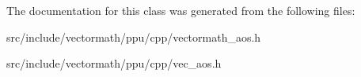 The documentation for this class was generated from the following files\-:\begin{DoxyCompactItemize}
\item 
src/include/vectormath/ppu/cpp/vectormath\-\_\-aos.\-h\item 
src/include/vectormath/ppu/cpp/vec\-\_\-aos.\-h\end{DoxyCompactItemize}

